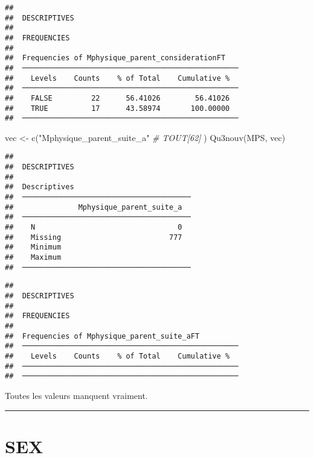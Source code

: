 \documentclass[
]{article}
\newenvironment{Shaded}{\begin{snugshade}}{\end{snugshade}}
\newcommand{\CommentTok}[1]{\textcolor[rgb]{0.56,0.35,0.01}{\textit{#1}}}
\newcommand{\FunctionTok}[1]{\textcolor[rgb]{0.00,0.00,0.00}{#1}}
\newcommand{\NormalTok}[1]{#1}
\newcommand{\OtherTok}[1]{\textcolor[rgb]{0.56,0.35,0.01}{#1}}
\newcommand{\StringTok}[1]{\textcolor[rgb]{0.31,0.60,0.02}{#1}}
\begin{document}
\begin{verbatim}
## 
##  DESCRIPTIVES
## 
##  FREQUENCIES
## 
##  Frequencies of Mphysique_parent_considerationFT    
##  ────────────────────────────────────────────────── 
##    Levels    Counts    % of Total    Cumulative %   
##  ────────────────────────────────────────────────── 
##    FALSE         22      56.41026        56.41026   
##    TRUE          17      43.58974       100.00000   
##  ──────────────────────────────────────────────────
\end{verbatim}

\begin{Shaded}
\begin{Highlighting}[]
\NormalTok{vec }\OtherTok{\textless{}{-}} \FunctionTok{c}\NormalTok{(}\StringTok{"Mphysique\_parent\_suite\_a"}     \CommentTok{\# TOUT[62]}
\NormalTok{)}
\FunctionTok{Qu3nouv}\NormalTok{(MPS, vec)}
\end{Highlighting}
\end{Shaded}

\begin{verbatim}
## 
##  DESCRIPTIVES
## 
##  Descriptives                            
##  ─────────────────────────────────────── 
##               Mphysique_parent_suite_a   
##  ─────────────────────────────────────── 
##    N                                 0   
##    Missing                         777   
##    Minimum                               
##    Maximum                               
##  ───────────────────────────────────────
\end{verbatim}

\begin{verbatim}
## 
##  DESCRIPTIVES
## 
##  FREQUENCIES
## 
##  Frequencies of Mphysique_parent_suite_aFT          
##  ────────────────────────────────────────────────── 
##    Levels    Counts    % of Total    Cumulative %   
##  ────────────────────────────────────────────────── 
##  ──────────────────────────────────────────────────
\end{verbatim}

Toutes les valeurs manquent vraiment.

\begin{center}\rule{0.5\linewidth}{0.5pt}\end{center}

\hypertarget{sex}{%
\section{SEX}\label{sex}}
\end{document}
